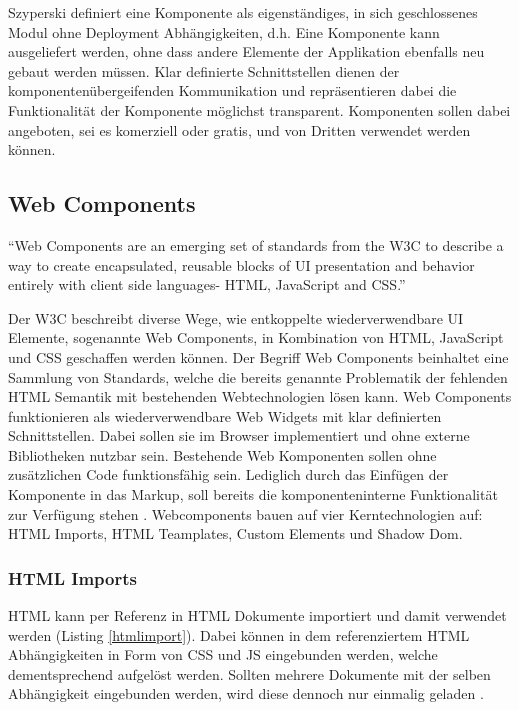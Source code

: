 Szyperski definiert eine Komponente als eigenständiges, in sich geschlossenes Modul ohne Deployment
Abhängigkeiten, d.h. Eine Komponente kann ausgeliefert werden, ohne dass andere Elemente der Applikation ebenfalls neu gebaut werden müssen.
Klar definierte Schnittstellen dienen der komponentenübergeifenden Kommunikation und repräsentieren
dabei die Funktionalität der Komponente möglichst transparent.
Komponenten sollen dabei angeboten, sei es komerziell oder gratis,
und von Dritten verwendet werden können.


\subsection{Web Components}

``Web Components are an emerging set of standards from the W3C to describe a way to create encapsulated,
reusable blocks of UI presentation and behavior entirely with client side languages- HTML, JavaScript and CSS.''
\cite[42]{Web-Component-Architecture}
\vspace{0.3cm}

Der W3C beschreibt diverse Wege, wie entkoppelte wiederverwendbare UI Elemente, sogenannte Web Components,
in Kombination von \ac{HTML}, JavaScript und \ac{CSS} geschaffen werden können.
Der Begriff Web Components beinhaltet eine Sammlung von Standards,
welche die bereits genannte Problematik der fehlenden HTML Semantik mit bestehenden Webtechnologien lösen kann.
Web Components funktionieren als wiederverwendbare Web Widgets mit klar definierten Schnittstellen.
Dabei sollen sie im Browser implementiert und ohne externe Bibliotheken nutzbar sein.
Bestehende Web Komponenten sollen ohne zusätzlichen Code funktionsfähig sein. Lediglich durch das Einfügen der Komponente
in das Markup, soll bereits die komponenteninterne Funktionalität zur Verfügung stehen
\cite[42]{Web-Component-Architecture}.
Webcomponents bauen auf vier Kerntechnologien auf: HTML Imports, HTML Teamplates, Custom Elements und Shadow Dom.

\subsubsection{HTML Imports}
HTML kann per Referenz in HTML Dokumente importiert und damit verwendet werden (Listing \ref{htmlimport}).
Dabei können in dem referenziertem HTML Abhängigkeiten in Form von CSS und JS eingebunden werden,
welche dementsprechend aufgelöst werden.
Sollten mehrere Dokumente mit der selben Abhängigkeit eingebunden werden, wird diese dennoch nur einmalig geladen
\cite{HTMLI44:online}.

